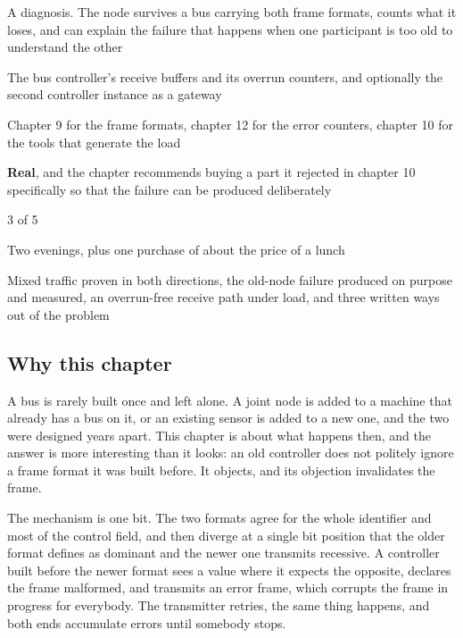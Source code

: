 
\begin{keyfacts}
\item[Adds to the node] A diagnosis. The node survives a bus carrying both frame formats, counts what it loses, and can explain the failure that happens when one participant is too old to understand the other
\item[Peripherals] The bus controller's receive buffers and its overrun counters, and optionally the second controller instance as a gateway
\item[Depends on] Chapter 9 for the frame formats, chapter 12 for the error counters, chapter 10 for the tools that generate the load
\item[Real or modelled] \textbf{Real}, and the chapter recommends buying a part it rejected in chapter 10 specifically so that the failure can be produced deliberately
\item[Difficulty] 3 of 5
\item[Effort] Two evenings, plus one purchase of about the price of a lunch
\item[Deliverable] Mixed traffic proven in both directions, the old-node failure produced on purpose and measured, an overrun-free receive path under load, and three written ways out of the problem
\end{keyfacts}

\subsection*{Why this chapter}

A bus is rarely built once and left alone. A joint node is added to a machine
that already has a bus on it, or an existing sensor is added to a new one, and
the two were designed years apart. This chapter is about what happens then, and
the answer is more interesting than it looks: an old controller does not
politely ignore a frame format it was built before. It objects, and its
objection invalidates the frame.

The mechanism is one bit. The two formats agree for the whole identifier and
most of the control field, and then diverge at a single bit position that the
older format defines as dominant and the newer one transmits recessive. A
controller built before the newer format sees a value where it expects the
opposite, declares the frame malformed, and transmits an error frame, which
corrupts the frame in progress for everybody. The transmitter retries, the same
thing happens, and both ends accumulate errors until somebody stops.

